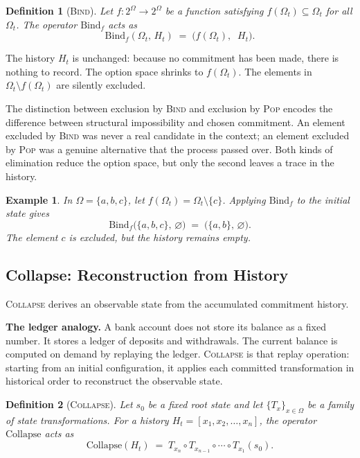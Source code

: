 \documentclass[12pt]{article}
\newtheorem{definition}{Definition}[section]
\newtheorem{example}{Example}[section]
\begin{document}
\begin{definition}[\textsc{Bind}]
Let $f : 2^\Omega \to 2^\Omega$ be a function satisfying $f(\Omega_t) \subseteq \Omega_t$ for all $\Omega_t$. The operator $\mathrm{Bind}_f$ acts as
\[
\mathrm{Bind}_f(\Omega_t,\, H_t) \;=\; \bigl(f(\Omega_t),\;\; H_t\bigr).
\]
\end{definition}

The history $H_t$ is unchanged: because no commitment has been made, there is nothing to record. The option space shrinks to $f(\Omega_t)$. The elements in $\Omega_t \setminus f(\Omega_t)$ are silently excluded.

The distinction between exclusion by \textsc{Bind} and exclusion by \textsc{Pop} encodes the difference between structural impossibility and chosen commitment. An element excluded by \textsc{Bind} was never a real candidate in the context; an element excluded by \textsc{Pop} was a genuine alternative that the process passed over. Both kinds of elimination reduce the option space, but only the second leaves a trace in the history.

\begin{example}
\label{ex:bind}
In $\Omega = \{a, b, c\}$, let $f(\Omega_t) = \Omega_t \setminus \{c\}$. Applying $\mathrm{Bind}_f$ to the initial state gives
\[
\mathrm{Bind}_f\bigl(\{a,b,c\},\, \varnothing\bigr) \;=\; \bigl(\{a,b\},\, \varnothing\bigr).
\]
The element $c$ is excluded, but the history remains empty.
\end{example}

\subsection{Collapse: Reconstruction from History}

\textsc{Collapse} derives an observable state from the accumulated commitment history.

\medskip
\noindent \textbf{The ledger analogy.} A bank account does not store its balance as a fixed number. It stores a ledger of deposits and withdrawals. The current balance is computed on demand by replaying the ledger. \textsc{Collapse} is that replay operation: starting from an initial configuration, it applies each committed transformation in historical order to reconstruct the observable state.
\medskip

\begin{definition}[\textsc{Collapse}]
Let $s_0$ be a fixed root state and let $\{T_x\}_{x \in \Omega}$ be a family of state transformations. For a history $H_t = [x_1, x_2, \ldots, x_n]$, the operator $\mathrm{Collapse}$ acts as
\[
\mathrm{Collapse}(H_t) \;=\; T_{x_n} \circ T_{x_{n-1}} \circ \cdots \circ T_{x_1}(s_0).
\]
\end{definition}
\end{document}
